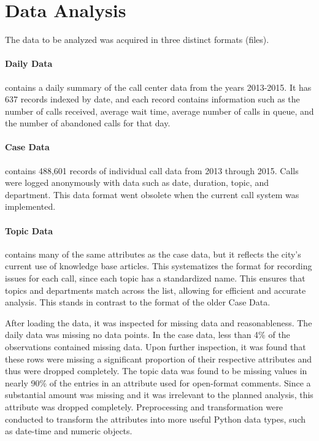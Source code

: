 \documentclass[12pt]{article}
\begin{document}
\section{Data Analysis}

The data to be analyzed was acquired in three distinct formats (files).

\paragraph{Daily Data} contains a daily summary of the call center data from the years 2013-2015.  It has 637 records indexed by date, and each record contains information such as the number of calls received, average wait time, average number of calls in queue, and the number of abandoned calls for that day.

\paragraph{Case Data} contains 488,601 records of individual call data from 2013 through 2015.  Calls were logged anonymously with data such as date, duration, topic, and department.  This data format went obsolete when the current call system was implemented.

\paragraph{Topic Data} contains many of the same attributes as the case data, but it reflects  the city's current use of knowledge base articles.  This systematizes the format for recording issues for each call, since each topic has a standardized name.  This ensures that topics and departments match across the list, allowing for efficient and accurate analysis.  This stands in contrast to the format of the older Case Data.

\par

After loading the data, it was inspected for missing data and reasonableness.  The daily data was missing no data points.  In the case data, less than 4\% of the observations contained missing data.  Upon further inspection, it was found that these rows were missing a significant proportion of their respective attributes and thus were dropped completely.  The topic data was found to be missing values in nearly 90\% of the entries in an attribute used for open-format comments.  Since a substantial amount was missing and it was irrelevant to the planned analysis, this attribute was dropped completely.  Preprocessing and transformation were conducted to transform the attributes into more useful Python data types, such as date-time and numeric objects.
\end{document}

